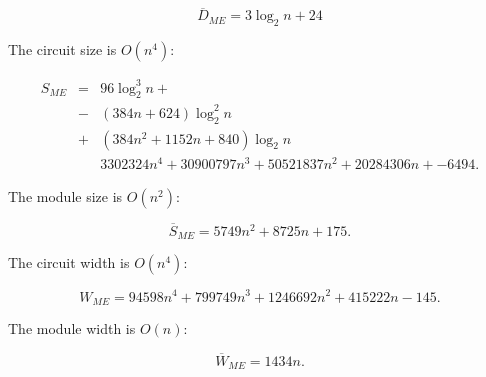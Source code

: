 \begin{equation}
\overline{D}_{ME} = 3\log_2 n + 24
\end{equation}

The circuit size is $O(n^4)$:

\begin{eqnarray}
S_{ME} & = & 96 \log_2^3 n + \nonumber \\
       & - & (384n + 624)\log_2^2 n \nonumber \\
       & + & (384n^2 + 1152n + 840) \log_2 n \nonumber \\
       &   & 3302324 n^4 + 30900797 n^3 + 50521837 n^2  + 20284306 n + 
  -6494\text{.}
\end{eqnarray}

The module size is $O(n^2)$:

\begin{equation}
\overline{S}_{ME} = 5749n^2 + 8725n +175\text{.}
\end{equation}

The circuit width is $O(n^4)$:

\begin{equation}
W_{ME} = 94598n^4 + 799749 n^3 + 1246692 n^2 + 415222 n - 145\text{.}
\end{equation}

The module width is $O(n)$:

\begin{equation}
\overline{W}_{ME} = 1434n\text{.}
\end{equation}